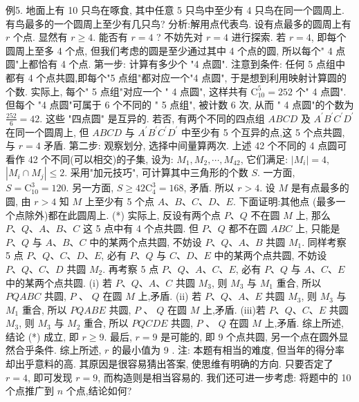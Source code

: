 例5. 地面上有 10 只鸟在啄食, 其中任意 5 只鸟中至少有 4 只鸟在同一个圆周上.
有鸟最多的一个圆周上至少有几只鸟?
分析:解用点代表鸟.
设有点最多的圆周上有 $r$ 个点.
显然有 $r \geqslant 4$. 能否有 $r=4$ ? 不妨先对 $r=4$ 进行探索.
若 $r=4$, 即每个圆周上至多 4 个点, 但我们考虑的圆是至少通过其中 4 个点的圆, 所以每个" 4 点圆"上都恰有 4 个点.
第一步: 计算有多少个 "4 点圆". 注意到条件: 任何 5 点组中都有 4 个点共圆,即每个"5 点组"都对应一个"4 点圆", 于是想到利用映射计算圆的个数.
实际上, 每个" 5 点组"对应一个 " 4 点圆", 这样共有 $\mathrm{C}_{10}^5=252$ 个" 4 点圆". 但每个 "4 点圆"可属于 6 个不同的 " 5 点组", 被计数 6 次, 从而 " 4 点圆"的个数为 $\frac{252}{6}=42$. 这些 "四点圆" 是互异的.
若否, 有两个不同的四点组 $A B C D$ 及 $A^{\prime} B^{\prime} C^{\prime} D^{\prime}$ 在同一个圆周上, 但 $A B C D$ 与 $A^{\prime} B^{\prime} C^{\prime} D^{\prime}$ 中至少有 5 个互异的点,这 5 个点共圆, 与 $r=4$ 矛盾.
第二步: 观察划分, 选择中间量算两次.
上述 42 个不同的 4 点圆可看作 42 个不同(可以相交)的子集, 设为: $M_1, M_2, \cdots, M_{42}$, 它们满足: $\left|M_i\right|=4$, $\left|M_i \cap M_j\right| \leqslant 2$. 采用"加元技巧", 可计算其中三角形的个数 $S$.
一方面, $S=\mathrm{C}_{10}^3=120$. 另一方面, $S \geqslant 42 \mathrm{C}_4^3=168$, 矛盾.
所以 $r>4$.
设 $M$ 是有点最多的圆, 由 $r>4$ 知 $M$ 上至少有 5 个点 $A 、 B 、 C 、 D 、 E$. 下面证明:其他点 (最多一个点除外)都在此圆周上. (*)
实际上, 反设有两个点 $P 、 Q$ 不在圆 $M$ 上, 那么 $P 、 Q 、 A 、 B 、 C$ 这 5 点中有 4 个点共圆.
但 $P 、 Q$ 都不在圆 $A B C$ 上, 只能是 $P 、 Q$ 与 $A 、 B 、 C$ 中的某两个点共圆, 不妨设 $P 、 Q 、 A 、 B$ 共圆 $M_1$.
同样考察 5 点 $P 、 Q 、 C 、 D 、 E$, 必有 $P 、 Q$ 与 $C 、 D 、 E$ 中的某两个点共圆, 不妨设 $P 、 Q 、 C 、 D$ 共圆 $M_2$. 再考察 5 点 $P 、 Q 、 A 、 C 、 E$, 必有 $P 、 Q$ 与 $A 、 C 、 E$ 中的某两个点共圆.
(i) 若 $P 、 Q 、 A 、 C$ 共圆 $M_3$, 则 $M_3$ 与 $M_1$ 重合, 所以 $P Q A B C$ 共圆, $P$ 、 $Q$ 在圆 $M$ 上,矛盾.
(ii) 若 $P 、 Q 、 A 、 E$ 共圆 $M_3$, 则 $M_3$ 与 $M_1$ 重合, 所以 $P Q A B E$ 共圆, $P$ 、 $Q$ 在圆 $M$ 上,矛盾.
(iii)若 $P 、 Q 、 C 、 E$ 共圆 $M_3$, 则 $M_3$ 与 $M_2$ 重合, 所以 $P Q C D E$ 共圆, $P$ 、 $Q$ 在圆 $M$ 上,矛盾.
综上所述, 结论 (*) 成立, 即 $r \geqslant 9$. 最后, $r=9$ 是可能的, 即 9 个点共圆, 另一个点在圆外显然合乎条件.
综上所述, $r$ 的最小值为 9 .
注: 本题有相当的难度, 但当年的得分率却出乎意料的高.
其原因是很容易猜出答案, 使思维有明确的方向.
只要否定了 $r=4$, 即可发现 $r=9$, 而构造则是相当容易的.
我们还可进一步考虑: 将题中的 10 个点推广到 $n$ 个点,结论如何?



